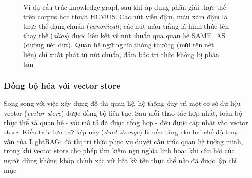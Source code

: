 \begin{figure}[H]
{
}%
\caption{Ví dụ cấu trúc knowledge graph sau khi áp dụng phân giải thực
thể trên corpus học thuật HCMUS. Các nút viền đậm, màu xám đậm là thực thể dạng
chuẩn (\textit{canonical}); các nút màu trắng là hình thức tên thay
thế (\textit{alias}) được liên kết về nút chuẩn qua quan hệ SAME\_AS
(đường nét đứt). Quan hệ ngữ nghĩa thông thường (mũi tên nét liền)
chỉ xuất phát từ nút chuẩn, đảm bảo tri thức không bị phân tán.}
\label{fig:sameas-graph}
\end{figure}

\subsubsection{Đồng bộ hóa với vector store}

Song song với việc xây dựng đồ thị quan hệ, hệ thống duy trì một cơ sở
dữ liệu vector (\textit{vector store}) được đồng bộ liên tục. Sau mỗi
thao tác hợp nhất, toàn bộ thực thể và quan hệ - với mô tả đã được
tổng hợp - đều được cập nhật vào vector store. Kiến trúc lưu trữ kép
này (\textit{dual storage}) là nền tảng cho hai chế độ truy vấn của
LightRAG: đồ thị tri thức phục vụ duyệt cấu trúc quan hệ tường minh,
trong khi vector store cho phép tìm kiếm ngữ nghĩa linh hoạt khi câu
hỏi của người dùng không khớp chính xác với bất kỳ tên thực thể nào
đã được lập chỉ mục.

